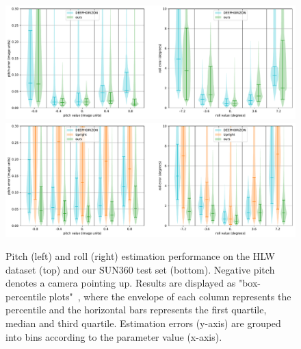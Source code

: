 \begin{figure}
\centering
\includegraphics[width=\linewidth]{figures/method/pitch_roll_performance_hlw.pdf} \\
\includegraphics[width=\linewidth]{figures/method/pitch_roll_performance_sun360.pdf}
\caption[Pitch and roll estimation performance]{Pitch (left) and roll (right) estimation performance on the HLW dataset (top) and our SUN360 test set (bottom). Negative pitch denotes a camera pointing up. Results are displayed as "box-percentile plots"~\cite{esty-jss-03}, where the envelope of each column represents the percentile and the horizontal bars represents the first quartile, median and third quartile. Estimation errors (y-axis) are grouped into bins according to the parameter value (x-axis).}
\label{fig:method_pitch_roll_performance}
\end{figure}

